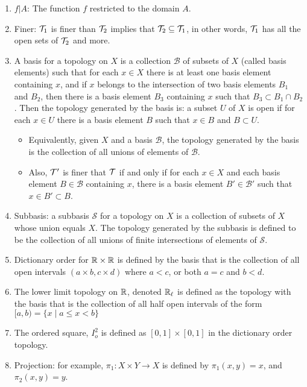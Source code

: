 \documentclass[12pt,letterpaper]{article}
\begin{document}
\begin{enumerate}
  \item \label{dfn:functionRestriction} $f|A$: The function $f$ restricted to the domain $A$.
  \item \label{dfn:finer} Finer: $\mathcal{T}_1$ is finer than $\mathcal{T}_2$ implies that $\mathcal{T}_2\subseteq \mathcal{T}_1$, in other words, $\mathcal{T}_1$ has all the open sets of $\mathcal{T}_2$ and more.
  \item \label{dfn:basis} A basis for a topology on $X$ is a collection $\mathcal{B}$ of subsets of $X$ (called basis elements) such that for each $x\in X$ there is at least one basis element containing $x$, and if $x$ belongs to the intersection of two basis elements $B_1$ and $B_2$, then there is a basis element $B_3$ containing $x$ such that $B_3 \subset B_1 \cap B_2$. Then the topology generated by the basis is: a subset $U$ of $X$ is open if for each $x\in U$ there is a basis element $B$ such that $x\in B$ and $B\subset U$.
  \begin{itemize}
    \item \label{thm:basisUnion} Equivalently, given $X$ and a basis $\mathcal{B}$, the topology generated by the basis is the collection of all unions of elements of $\mathcal{B}$.
    \item \label{thm:basisFiner} Also, $\mathcal{T}'$ is finer that $\mathcal{T}$ if and only if for each $x\in X$ and each basis element $B\in\mathcal{B}$ containing $x$, there is a basis element $B'\in \mathcal{B}'$ such that $x\in B'\subset B$.
  \end{itemize}
  \item \label{dfn:subbasis} Subbasis: a subbasis $\mathcal{S}$ for a topology on $X$ is a collection of subsets of $X$ whose union equals $X$. The topology generated by the subbasis is defined to be the collection of all unions of finite intersections of elements of $\mathcal{S}$.
  \item \label{dfn:dictionaryOrder} Dictionary order for $\mathbb{R}\times\mathbb{R}$ is defined by the basis that is the collection of all open intervals $(a\times b, c\times d)$ where $a<c$, or both $a=c$ and $b<d$.
  \item \label{dfn:lowerLimitTopology} The lower limit topology on $\mathbb{R}$, denoted $\mathbb{R}_\ell$ is defined as the topology with the basis that is the collection of all half open intervals of the form $[a,b) = \{ x\; |\; a\leq x < b \}$
  \item \label{dfn:orderedSquare} The ordered square, $I_o^2$ is defined as $[0,1]\times [0,1]$ in the dictionary order topology.
  \item \label{dfn:projection} Projection: for example, $\pi_1: X\times Y \rightarrow X$ is defined by $\pi_1(x,y)=x$, and $\pi_2(x,y)=y$.

\end{enumerate}
\end{document}
